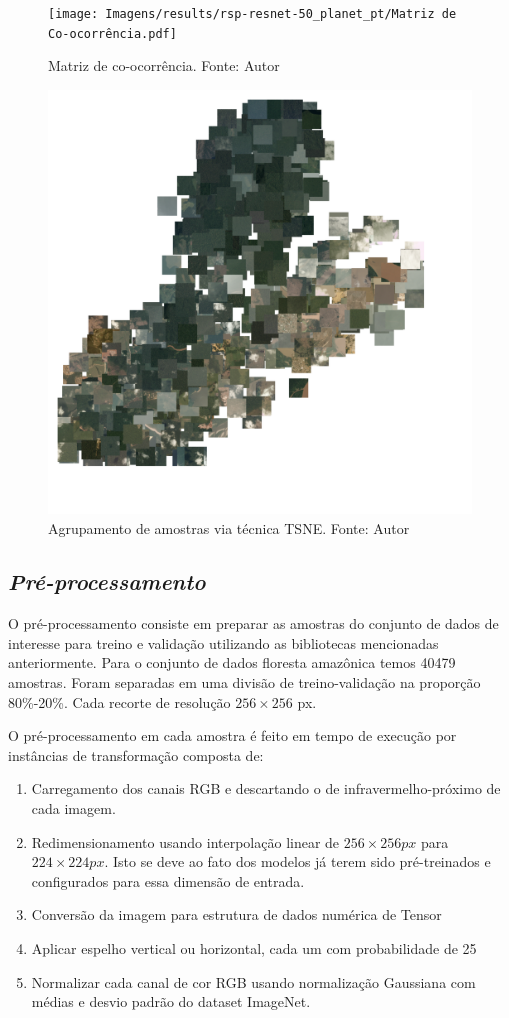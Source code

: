 \begin{figure}[!ht]
    \centering
    \texttt{[image: Imagens/results/rsp-resnet-50\_planet\_pt/Matriz de Co-ocorrência.pdf]}
    \caption{Matriz de co-ocorrência.
    Fonte: Autor}
   \label{fig:coocorrencia}
\end{figure}

\begin{figure}[!ht]
    \centering
    \includegraphics[width=0.7\columnwidth]{Imagens/results/rsp-resnet-50_planet_pt/TSNE Clustering.pdf}
    \caption{Agrupamento de amostras via técnica TSNE.
    Fonte: Autor}
   \label{fig:TSNE}
\end{figure}

\subsection{\textit{Pré-processamento}}\label{sec:Cap3_PreProcess}
O pré-processamento consiste em preparar as amostras do conjunto de dados de interesse para treino e validação utilizando as bibliotecas mencionadas anteriormente. Para o conjunto de dados floresta amazônica temos 40479 amostras. Foram separadas em uma divisão de treino-validação na proporção 80\%-20\%. Cada recorte de resolução $256 \times 256$ px.

O pré-processamento em cada amostra é feito em tempo de execução por instâncias de transformação composta de:
\begin{enumerate}
    \item   Carregamento dos canais RGB e descartando o de infravermelho-próximo de cada imagem.
    \item   Redimensionamento usando interpolação linear de $256 \times 256px$ para $224 \times 224px$. Isto se deve ao fato dos modelos já terem sido pré-treinados e configurados para essa dimensão de entrada.
    \item   Conversão da imagem para estrutura de dados numérica de Tensor
    \item   Aplicar espelho vertical ou horizontal, cada um com probabilidade de 25%
    \item   Normalizar cada canal de cor RGB usando normalização Gaussiana com médias e desvio padrão do dataset ImageNet.
\end{enumerate}


